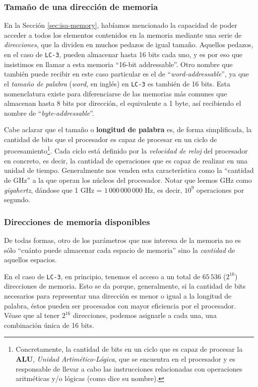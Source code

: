 \documentclass[a4paper, titlepage]{report}
\begin{document}
	\subsubsection{Tamaño de una dirección de memoria}
	
	En la Sección \ref{sec:isa-memory}, habíamos mencionado la capacidad de poder acceder a todos los elementos contenidos en la memoria mediante una serie de \textit{direcciones}, que la dividen en muchos pedazos de igual tamaño. Aquellos pedazos, en el caso de \texttt{LC-3}, pueden almacenar hasta 16 bits cada uno, y es por eso que insistimos en llamar a esta memoria ``16-bit addressable''. Otro nombre que también puede recibir en este caso particular es el de ``\textit{word-addressable}'', ya que el \textit{tamaño de palabra} (\textit{word}, en inglés) en \texttt{LC-3} es también de 16 bits. Esta nomenclatura existe para diferenciarse de las memorias más comunes que almacenan hasta 8 bits por dirección, el equivalente a 1 byte, así recibiendo el nombre de ``\textit{byte-addressable}''.
	
	Cabe aclarar que el tamaño o \textbf{longitud de palabra} es, de forma simplificada, la cantidad de bits que el procesador es capaz de procesar en un ciclo de procesamiento\footnote{Concretamente, la cantidad de bits en un ciclo que es capaz de procesar la \textbf{ALU}, \textit{Unidad Artimético-Lógica}, que se encuentra en el procesador y es responsable de llevar a cabo las instrucciones relacionadas con operaciones aritméticas y/o lógicas (como dice su nombre).}. Cada ciclo está definido por la \textit{velocidad de reloj} del procesador en concreto, es decir, la cantidad de operaciones que es capaz de realizar en una unidad de tiempo. Generalmente nos venden esta característica como la ``cantidad de GHz'' a la que operan los núcleos del procesador. Notar que leemos GHz como \textit{gigahertz}, dándose que 1 GHz = $1\,000\,000\,000$ Hz, es decir, $10^9$ operaciones por segundo.
	
	\subsubsection{Direcciones de memoria disponibles}
	
	De todas formas, otro de los parámetros que nos interesa de la memoria no es sólo ``cuánto puede almacenar cada espacio de memoria'' sino la \textit{cantidad} de aquellos espacios.
	
	En el caso de \texttt{LC-3}, en principio, tenemos el acceso a un total de $65\,536$ ($2^{16}$) direcciones de memoria. Esto se da porque, generalmente, si la cantidad de bits necesarios para representar una dirección es menor o igual a la longitud de palabra, éstos pueden ser procesados con mayor eficiencia por el procesador. Véase que al tener $2^{16}$ direcciones, podemos asignarle a cada una, una combinación única de 16 bits.
	
\end{document}
